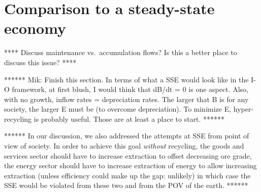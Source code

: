 \section{Comparison to a steady-state economy}

**** Discuss maintenance vs.\ accumulation flows? 
Is this a better place to discuss this issue? ****

****** Mik: Finish this section. 
In terms of what a SSE would look like in the I-O framework, 
at first blush, I would think that dB/dt = 0 is one aspect.  
Also, with no growth, inflow rates = depreciation rates.  
The larger that B is for any society, the larger E must be (to overcome depreciation).  
To minimize E, hyper-recycling is probably useful.  
Those are at least a place to start. ******

****** In our discussion, 
we also addressed the attempts at SSE from point of view of society. 
In order to achieve this goal \emph{without} recycling, 
the goods and services sector should have to increase extraction to offset decreasing ore grade, 
the energy sector should have to increase extraction of energy 
to allow increasing extraction (unless efficiency could make up the gap: unlikely) 
in which case the SSE would be violated from these two and from the POV of the earth.
******








%
%

